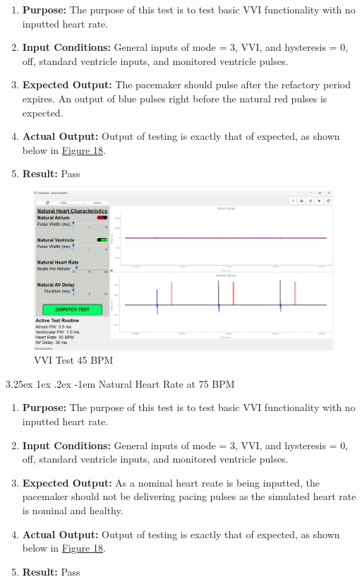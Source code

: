 \documentclass{article}
\makeatletter
\renewcommand\paragraph{\@startsection{paragraph}{5}{\z@}%
  {3.25ex \@plus1ex \@minus.2ex}%
  {-1em}%
  {\normalfont\normalsize\bfseries}}
\makeatother
\begin{document}
\begin{enumerate}[label=]
   \item \textbf{Purpose:} The purpose of this test is to test basic VVI functionality with no inputted heart rate.
   \item \textbf{Input Conditions:} General inputs of mode = 3, VVI, and hysteresis = 0, off, standard ventricle 
   inputs, and monitored ventricle pulses.
   \item \textbf{Expected Output:} The pacemaker should pulse after the refactory period expires. An output of blue pulses right before the natural 
   red pulses is expected.
   \item \textbf{Actual Output:} Output of testing is exactly that of expected, as shown below in \hyperref[VVItest45]{Figure 18}.
   \item \textbf{Result:} Pass
\end{enumerate}

\begin{tcolorbox}
    \begin{figure}[H]\label{VVItest45}
        \includegraphics[width=\textwidth]{VVItest35.png}
        \caption{VVI Test 45 BPM}
        
    \end{figure}
\end{tcolorbox}

\newpage
\paragraph{Natural Heart Rate at 75 BPM}

\begin{enumerate}[label=]
   \item \textbf{Purpose:} The purpose of this test is to test basic VVI functionality with no inputted heart rate.
   \item \textbf{Input Conditions:} General inputs of mode = 3, VVI, and hysteresis = 0, off, standard ventricle 
   inputs, and monitored ventricle pulses.
   \item \textbf{Expected Output:} As a nominal heart reate is being inputted, the pacemaker should not be delivering pacing pulses 
   as the simulated heart rate is nominal and healthy.
   \item \textbf{Actual Output:} Output of testing is exactly that of expected, as shown below in \hyperref[VVItest45]{Figure 18}.
   \item \textbf{Result:} Pass
\end{enumerate}
\end{document}
